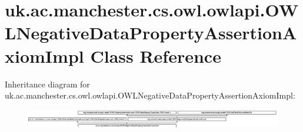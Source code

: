 \hypertarget{classuk_1_1ac_1_1manchester_1_1cs_1_1owl_1_1owlapi_1_1_o_w_l_negative_data_property_assertion_axiom_impl}{\section{uk.\-ac.\-manchester.\-cs.\-owl.\-owlapi.\-O\-W\-L\-Negative\-Data\-Property\-Assertion\-Axiom\-Impl Class Reference}
\label{classuk_1_1ac_1_1manchester_1_1cs_1_1owl_1_1owlapi_1_1_o_w_l_negative_data_property_assertion_axiom_impl}
}
Inheritance diagram for uk.\-ac.\-manchester.\-cs.\-owl.\-owlapi.\-O\-W\-L\-Negative\-Data\-Property\-Assertion\-Axiom\-Impl\-:\begin{figure}[H]
\begin{center}
\leavevmode
\includegraphics[height=0.819912cm]{classuk_1_1ac_1_1manchester_1_1cs_1_1owl_1_1owlapi_1_1_o_w_l_negative_data_property_assertion_axiom_impl}
\end{center}
\end{figure}
